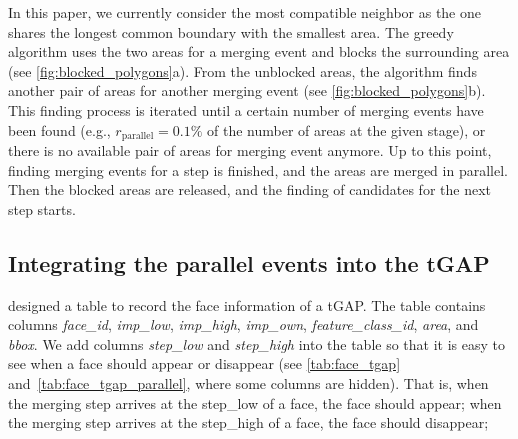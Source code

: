 \documentclass[ijgi,article,submit,moreauthors,pdftex]{Definitions/mdpi}
\begin{document}
In this paper, we currently consider the most compatible neighbor
as the one shares the longest common boundary with the smallest area.
The greedy algorithm uses the two areas for a merging event
and blocks the surrounding area (see \fig\ref{fig:blocked_polygons}a).
From the unblocked areas, the algorithm finds another pair of areas
for another merging event
(see \fig\ref{fig:blocked_polygons}b).
This finding process is iterated 
until a certain number of merging events have been found 
(e.g., $r_\mathrm{parallel} = 0.1\%$ of the number of areas at the given stage), 
or there is no available pair of areas for merging event anymore.
Up to this point, finding merging events for a step is finished,
and the areas are merged in parallel.
Then the blocked areas are released, 
and the finding of candidates for the next step starts.



%
%

\subsection{Integrating the parallel events into the tGAP}

\citet[\fig5.9b]{Meijers2011Thesis} designed a table 
to record the face information of a tGAP.
The table contains columns \emph{face\_id}, 
\emph{imp\_low}, \emph{imp\_high}, \emph{imp\_own},
\emph{feature\_class\_id}, \emph{area}, and \emph{bbox}.
We add columns \emph{step\_low} and \emph{step\_high} into the table 
so that it is easy to see when a face should appear or disappear 
(see \tbls\ref{tab:face_tgap} and~\ref{tab:face_tgap_parallel},
where some columns are hidden).
That is, when the merging step arrives at the step\_low of a face,
the face should appear;
when the merging step arrives at the step\_high of a face,
the face should disappear;
\end{document}
